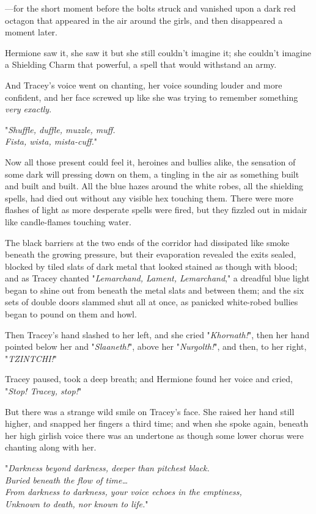 ---for the short moment before the bolts struck and vanished upon a dark red
octagon that appeared in the air around the girls, and then disappeared a
moment later.

Hermione saw it, she saw it but she still couldn't imagine it; she couldn't
imagine a Shielding Charm that powerful, a spell that would withstand an army.

And Tracey's voice went on chanting, her voice sounding louder and more
confident, and her face screwed up like she was trying to remember something
\emph{very exactly}.

"\emph{Shuffle, duffle, muzzle, muff.\\
Fista, wista, mista-cuff.}"

Now all those present could feel it, heroines and bullies alike, the sensation
of some dark will pressing down on them, a tingling in the air as something
built and built and built. All the blue hazes around the white robes, all the
shielding spells, had died out without any visible hex touching them. There
were more flashes of light as more desperate spells were fired, but they
fizzled out in midair like candle-flames touching water.

The black barriers at the two ends of the corridor had dissipated like smoke
beneath the growing pressure, but their evaporation revealed the exits sealed,
blocked by tiled slats of dark metal that looked stained as though with blood;
and as Tracey chanted "\emph{Lemarchand, Lament, Lemarchand}," a dreadful blue
light began to shine out from beneath the metal slats and between them; and the
six sets of double doors slammed shut all at once, as panicked white-robed
bullies began to pound on them and howl.

Then Tracey's hand slashed to her left, and she cried "\emph{Khornath!}", then
her hand pointed below her and "\emph{Slaaneth!}", above her
"\emph{Nurgolth!}", and then, to her right, "\emph{TZINTCHI!}"

Tracey paused, took a deep breath; and Hermione found her voice and cried,
"\emph{Stop! Tracey, stop!}"

But there was a strange wild smile on Tracey's face. She raised her hand still
higher, and snapped her fingers a third time; and when she spoke again, beneath
her high girlish voice there was an undertone as though some lower chorus were
chanting along with her.

"\emph{Darkness beyond darkness, deeper than pitchest black.\\
Buried beneath the flow of time{\ldots}\\
From darkness to darkness, your voice echoes in the emptiness,\\
Unknown to death, nor known to life.}"


